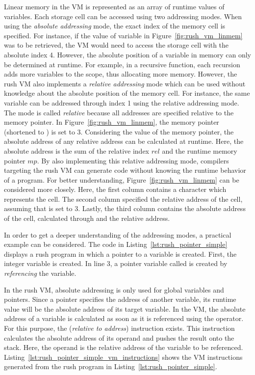 Linear memory in the VM is represented as an array of runtime values of variables.
Each storage cell can be accessed using two addressing modes.
When using the \emph{absolute addressing} mode, the exact index of the memory cell is specified.
For instance, if the value of variable  in Figure~\ref{fig:rush_vm_linmem} was to be retrieved,
the VM would need to access the storage cell with the absolute index 4.
However, the absolute position of a variable in memory can only be determined at runtime.
For example, in a recursive function, each recursion adds more variables to the scope, thus allocating more memory.
However, the rush VM also implements a \emph{relative addressing} mode which can be used without knowledge about the absolute position of the memory cell.
For instance, the same variable can be addressed through index 1 using the relative addressing mode.
The mode is called \emph{relative} because all addresses are specified relative to the memory pointer.
In Figure~\ref{fig:rush_vm_linmem}, the memory pointer (shortened to ) is set to 3.
Considering the value of the memory pointer, the absolute address of any relative address can be calculated at runtime.
Here, the absolute address is the sum of the relative index $rel$ and the runtime memory pointer $mp$.
By also implementing this relative addressing mode,
compilers targeting the rush VM can generate code without knowing the runtime behavior of a program.
For better understanding, Figure~\ref{fig:rush_vm_linmem} can be considered more closely.
Here, the first column contains a character which represents the cell.
The second column specified the relative address of the cell, assuming that  is set to 3.
Lastly, the third column contains the absolute address of the cell, calculated through  and the relative address.

In order to get a deeper understanding of the addressing modes, a practical example can be considered.
The code in Listing~\ref{lst:rush_pointer_simple} displays a rush program in which a pointer to a variable is created.
First, the integer variable  is created.
In line 3, a pointer variable called  is created by \emph{referencing} the  variable.


In the rush VM, absolute addressing is only used for global variables and pointers.
Since a pointer specifies the address of another variable, its runtime value will be the absolute address of its target variable.
In the VM, the absolute address of a variable is calculated as soon as it is referenced using the \qVerb{&} operator.
For this purpose, the  (\emph{relative to address}) instruction exists.
This instruction calculates the absolute address of its operand and pushes the result onto the stack.
Here, the operand is the relative address of the variable to be referenced.
Listing~\ref{lst:rush_pointer_simple_vm_instructions} shows the VM instructions generated from the rush program in Listing~\ref{lst:rush_pointer_simple}.

